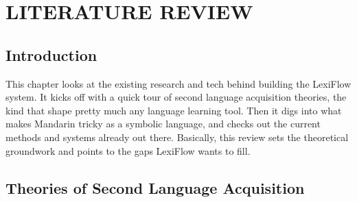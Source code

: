 \chapter{LITERATURE REVIEW}
\section{Introduction}This chapter looks at the existing research and tech behind building the LexiFlow system. It kicks off with a quick tour of second language acquisition theories, the kind that shape pretty much any language learning tool. Then it digs into what makes Mandarin tricky as a symbolic language, and checks out the current methods and systems already out there. Basically, this review sets the theoretical groundwork and points to the gaps LexiFlow wants to fill.
\section{Theories of Second Language Acquisition}

